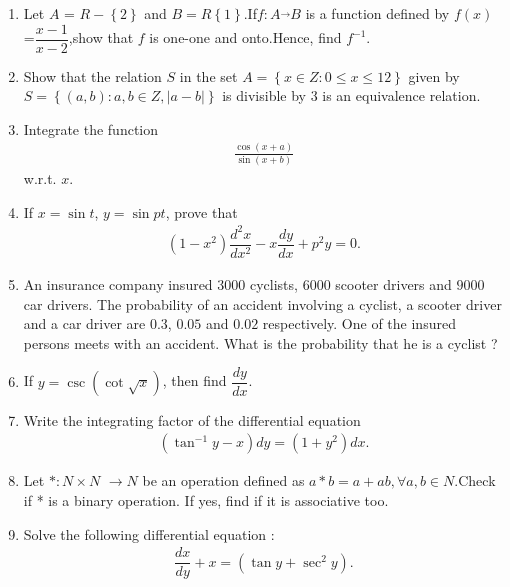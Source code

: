 \documentclass[12pt,-letter paper]{article}
\providecommand{\cbrak}[1]{\ensuremath{\left\{#1\right\}}}
\providecommand{\brak}[1]{\ensuremath{\left(#1\right)}}
\providecommand{\abs}[1]{\left\vert#1\right\vert}
\begin{document}
\begin{enumerate}
    \item Let $A$ = $R-\cbrak{2}$ and $B=R\cbrak{1}$.If$f:A\overrightarrow{}  B$ is a function defined by $f\brak{x}$=$\dfrac{x-1}{x-2}$,show that $f$ is one-one and onto.Hence, find $f^{-1}$.

    \item Show that the relation $S$ in the set $A = \cbrak{x \in Z : 0 \leq x \leq 12}$ given by $S = \cbrak{(a,b) : a, b \in Z, \abs{a-b}}$ is divisible by $3$ is an equivalence relation.

    \item Integrate the function
    \begin{align*}
    \frac{\cos{\brak{x+a}}}{\sin{\brak{x+b}}}
    \end{align*}
    w.r.t. $x$.

    \item If $x = \sin{t}$, $y = \sin{pt}$, prove that
    \begin{align*}
    \brak{1-x^{2}}\dfrac{d^{2}x}{dx^{2}}-x\dfrac{dy}{dx}+p^{2}y=0.
    \end{align*}

    \item An insurance company insured $3000$ cyclists, $6000$ scooter drivers and $9000$ car drivers. The probability of an accident involving a cyclist, a scooter driver and a car driver are $0.3$, $0.05$ and $0.02$ respectively. One of the insured persons meets with an accident. What is the probability that he is a cyclist ?

    \item If $y=\csc{\brak{\cot{\sqrt{x}}}}$, then find $\dfrac{dy}{dx}$.

    \item Write the integrating factor of the differential equation
    \begin{align*}
    \brak{\tan^{-1}{y-x}}dy=\brak{1+y^{2}}dx.
    \end{align*}

    \item Let $* : N \times N$ $\rightarrow N $ be an operation defined as $a * b = a + ab, \forall a, b \in N $.Check if * is a binary operation. If yes, find if it is associative too.

    \item Solve the following differential equation :
     \begin{align*}
         \dfrac{dx}{dy}+x=\brak{\tan{y}+\sec^{2}{y}}.
     \end{align*}
    
\end{enumerate}
\end{document}
